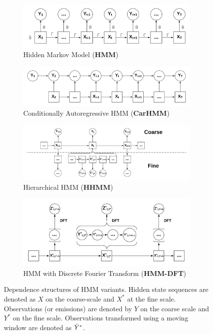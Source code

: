 \begin{figure}[ht]
    \begin{subfigure}{\textwidth}
      \centering
      \includegraphics[width=4in]{../Plots/HMM.png}  
      \caption{Hidden Markov Model (\textbf{HMM})}
      \label{fig:HMM}
    \end{subfigure}
    \newline
    \begin{subfigure}{\textwidth}
      \centering
      \includegraphics[width=4in]{../Plots/CarHMM.png}  
      \caption{Conditionally Autoregressive HMM (\textbf{CarHMM})}
      \label{fig:CarHMM}
    \end{subfigure}
    \newline
    \begin{subfigure}{\textwidth}
      \centering
      \includegraphics[width=4in]{../Plots/HHMM.png}  
      \caption{Hierarchical HMM (\textbf{HHMM})}
      \label{fig:HHMM}
    \end{subfigure}
    \newline
    \begin{subfigure}{\textwidth}
      \centering
      \includegraphics[width=4in]{../Plots/HMM-DFT.png}  
      \caption{HMM with Discrete Fourier Transform (\textbf{HMM-DFT})}
      \label{fig:HMM-DFT}
    \end{subfigure}
    \caption{Dependence structures of HMM variants. Hidden state sequences are denoted as $X$ on the coarse-scale and $X^*$ at the fine scale. Observations (or emissions) are denoted by $Y$ on the coarse scale and $Y^*$ on the fine scale. Observations transformed using a moving window are denoted as $\tilde{Y}^*$.}
    \label{fig:models}
\end{figure}

